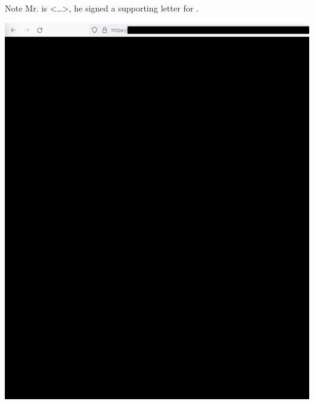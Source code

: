 
Note Mr. \MrPhpOne is <\dots>, he signed a supporting letter for \mrl.

\begin{center}
    \includegraphics[width=36em]{php-one-company-role-p1_public}
\end{center}
\WillContinue
\pagebreak

